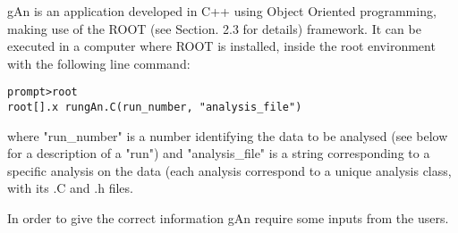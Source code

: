 gAn is an application developed in C++ using Object Oriented programming, making 
use of the ROOT (see Section. 2.3 for details) framework. It can be executed in a computer where ROOT 
is installed, inside the root environment with the following line command: 
\begin{verbatim}
prompt>root
root[].x rungAn.C(run_number, "analysis_file")
\end{verbatim}

where "run\_number" is a number identifying the data to be analysed (see below for a description of 
a "run") and "analysis\_file" is a string corresponding to a specific analysis on the data (each analysis
correspond to a unique analysis class, with its .C and .h files.


In order to give the correct information gAn require some inputs from the users.


